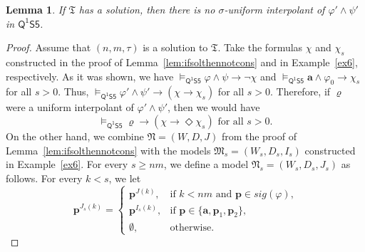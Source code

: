 \documentclass[10pt,a4paper]{amsart}
\theoremstyle{plain}
\newtheorem{lem}[thm]{Lemma}
\theoremstyle{definition}
\newcommand{\sig}{\mathit{sig}}
\newcommand{\tiling}{\mathfrak T}
\newcommand{\FOMS}{\ensuremath{\mathsf{Q^1S5}}}
\newcommand{\fform}[1]{\boldsymbol{#1}}
\newcommand{\pvar}{\fform{p}}
\newcommand{\avar}{\fform{a}}
\newcommand{\gvar}{\fform{g}}
\newcommand{\tvar}{\fform{t}}
\newcommand{\xvar}{\fform{x}}
\newcommand{\yvar}{\fform{y}}
\begin{document}
		\begin{lem}
			If $\tiling$ has a solution, then there is no $\sigma$-uniform interpolant of $\varphi'\wedge \psi'$ in $\FOMS$.
		\end{lem}
		\begin{proof}
			Assume that $(n,m,\tau)$ is a solution to $\tiling$.
			Take the formulas $\chi$ and $\chi_{s}$ constructed in the proof of Lemma~\ref{lem:ifsolthennotcons} and in Example~\ref{ex6}, respectively. As it was shown, we have $\models_\FOMS\varphi\land\psi\to\neg\chi$ and 
			$\models_\FOMS\avar\land\varphi_0\to\chi_s$ for all $s>0$. Thus, 
			$\models_\FOMS \varphi' \wedge \psi' \rightarrow (\chi \rightarrow \chi_{s})$ for all $s>0$. 
			Therefore, if $\varrho$ were a uniform interpolant of $\varphi'\land\psi'$, then we would have 
			\begin{equation}
				\label{follows}
				\models_\FOMS\varrho\to(\chi \rightarrow \Diamond\chi_{s})\mbox{ for all $s>0$}.
			\end{equation}
			On the other hand, we combine $\mathfrak{N}=(W,D,J)$ from the proof of Lemma~\ref{lem:ifsolthennotcons} with the models $\mathfrak{M}_{s}=(W_{s},D_{s},I_{s})$ constructed in Example~\ref{ex6}.
			For every $s\geq nm$, we define a model $\mathfrak{N}_{s}=(W_{s},D_{s},J_{s})$ as follows. For every $k<s$, we let	
			\[
			\pvar^{J_s(k)} = \left\{
			\begin{array}{ll}
				\pvar^{J(k)},  & \mbox{if $k<nm$ and $\pvar\in\sig(\varphi)$,}\\[3pt]
				\pvar^{I_s(k)},  & \mbox{if $\pvar\in\{\avar,\pvar_1,\pvar_2\}$,}\\[3pt]
				\emptyset, &\mbox{otherwise.}
			\end{array}
			\right.
			\]

\end{proof}
\end{document}
